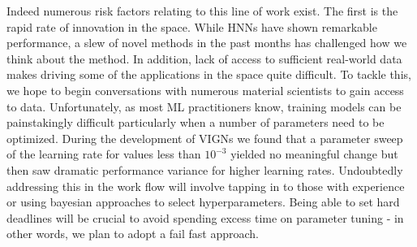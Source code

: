 \documentclass{article}
\begin{document}
Indeed numerous risk factors relating to this line of work exist. The first is the rapid rate of innovation in the space. While HNNs have shown remarkable performance, a slew of novel methods in the past months has challenged how we think about the method. In addition, lack of access to sufficient real-world data makes driving some of the applications in the space quite difficult. To tackle this, we hope to begin conversations with numerous material scientists to gain access to data. Unfortunately, as most ML practitioners know, training models can be painstakingly difficult particularly when a number of parameters need to be optimized. During the development of VIGNs we found that a parameter sweep of the learning rate for values less than $10^{-3}$ yielded no meaningful change but then saw dramatic performance variance for higher learning rates. Undoubtedly addressing this in the work flow will involve tapping in to those with experience or using bayesian approaches to select hyperparameters. Being able to set hard deadlines will be crucial to avoid spending excess time on parameter tuning - in other words, we plan to adopt a fail fast approach.
\end{document}
